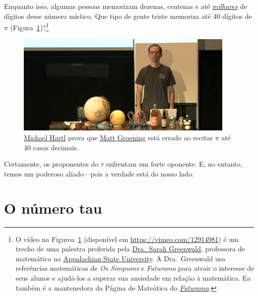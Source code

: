 {Enquanto isso, algumas pessoas memorizam dezenas, centenas e até \href{https://www.guinnessworldrecords.com/world-records/most-pi-places-memorised}{\emph{milhares}} de dígitos desse número místico. Que tipo de gente triste memoriza até 40 dígitos de $\pi$ (Figura~\ref{fig:futurama_video})?\footnote{O vídeo na Figurea~\ref{fig:futurama_video} (disponível em \href{https://vimeo.com/12914981}{https://vimeo.com/12914981}) é um trecho de uma palestra proferida pela \href{https://cs.appstate.edu/~sjg/}{Dra.\ Sarah Greenwald}, professora de matemática na \href{https://www.appstate.edu/}{Appalachian State University}. A Dra.\ Greenwald usa referências matemáticas de \emph{Os Simpsons} e \emph{Futurama} para atrair o interesse de seus alunos e ajudá-los a superar sua ansiedade em relação à matemática. Ea também é a mantenedora da Página de Mateática do \href{https://cs.appstate.edu/~sjg/futurama/}{\emph{Futurama}}.}

\begin{figure}
\begin{center}
\includegraphics{images/figures/futurama_math_lecture.png} %
\end{center}
\caption{\href{https://tauday.com/tau-manifesto/\#sec-about_the_author}{Michael Hartl} prova que \href{https://en.wikipedia.org/wiki/Matt_Groening}{Matt Groening} está errado ao recitar $\pi$ até 40 casas decimais.\label{fig:futurama_video}}
\end{figure}

Certamente, os proponentes do $\tau$ enfrentam um forte oponente. E, no entanto, temos um poderoso aliado---pois a verdade está do nosso lado.


\section{O número tau} %
\label{sec:the_number_tau}

}
